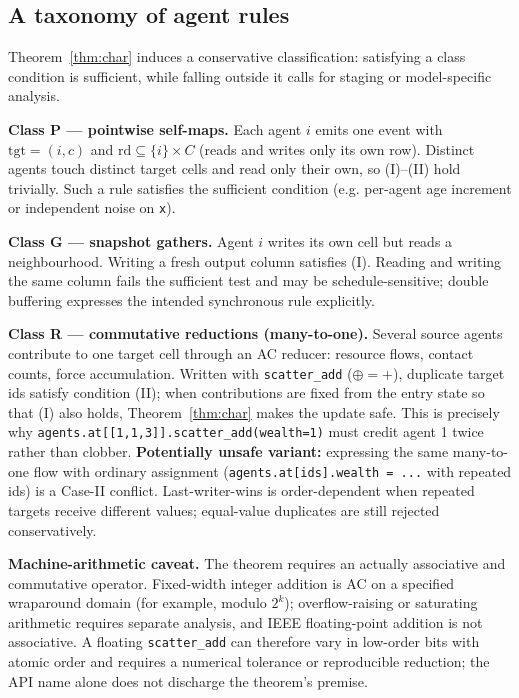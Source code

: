 \documentclass[sigconf,nonacm,review,natbib=true]{acmart}
\theoremstyle{definition}
\theoremstyle{plain}
\theoremstyle{remark}
\begin{document}
\subsection{A taxonomy of agent rules}\label{ax:tax}

Theorem~\ref{thm:char} induces a conservative classification: satisfying a
class condition is sufficient, while falling outside it calls for staging or
model-specific analysis.

\textbf{Class P --- pointwise self-maps.} Each agent $i$ emits one event with $\mathrm{tgt}=(i,c)$ and $\mathrm{rd}\subseteq\{i\}\times C$ (reads and writes only its own row). Distinct agents touch distinct target cells and read only their own, so (I)--(II) hold trivially. Such a rule satisfies the sufficient condition (e.g. per-agent age increment or independent noise on \texttt{x}).

\textbf{Class G --- snapshot gathers.} Agent $i$ writes its own cell but reads
a neighbourhood. Writing a fresh output column satisfies (I). Reading and
writing the same column fails the sufficient test and may be schedule-sensitive;
double buffering expresses the intended synchronous rule explicitly.

\textbf{Class R --- commutative reductions (many-to-one).} Several source agents contribute to one target cell through an AC reducer: resource flows, contact counts, force accumulation. Written with \texttt{scatter\_add} ($\oplus=+$), duplicate target ids satisfy condition (II); when contributions are fixed from the entry state so that (I) also holds, Theorem~\ref{thm:char} makes the update safe. This is precisely why \texttt{agents.\allowbreak{}at[\allowbreak{}[\allowbreak{}1,1,3]\allowbreak{}]\allowbreak{}.\allowbreak{}scatter\_\allowbreak{}add(\allowbreak{}wealth=\allowbreak{}1)\allowbreak{}} must credit agent 1 twice rather than clobber. \textbf{Potentially unsafe variant:} expressing the same many-to-one flow with ordinary assignment (\texttt{agents.\allowbreak{}at[\allowbreak{}ids]\allowbreak{}.\allowbreak{}wealth =\allowbreak{} .\allowbreak{}.\allowbreak{}.\allowbreak{}} with repeated ids) is a Case-II conflict. Last-writer-wins is order-dependent when repeated targets receive different values; equal-value duplicates are still rejected conservatively.

\textbf{Machine-arithmetic caveat.} The theorem requires an actually
associative and commutative operator. Fixed-width integer addition is AC on a
specified wraparound domain (for example, modulo $2^k$); overflow-raising or
saturating arithmetic requires separate analysis, and IEEE floating-point
addition is not associative. A
floating \texttt{scatter\_add} can therefore vary in low-order bits with atomic
order and requires a numerical tolerance or reproducible reduction; the API
name alone does not discharge the theorem's premise.
\end{document}
